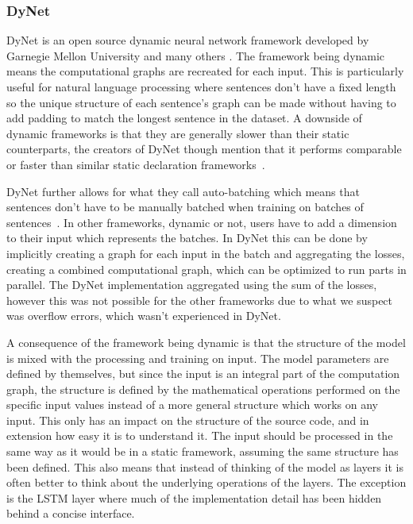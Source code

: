 \subsubsection*{DyNet}\label{sec:setup-implementations-dynet}

DyNet is an open source dynamic neural network framework developed by Garnegie
Mellon University and many others \cite{dynet-git}. The
framework being dynamic means the computational graphs are recreated for each
input. This is particularly useful for natural language processing where
sentences don't have a fixed length so the unique structure of each sentence's
graph can be made without having to add padding to match the longest sentence in
the dataset. A downside of dynamic frameworks is that they are generally slower
than their static counterparts, the creators of DyNet though mention that it
performs comparable or faster than similar static declaration
frameworks~\cite{dynet}.   

DyNet further allows for what they call auto-batching which means that sentences
don't have to be manually batched when training on batches of
sentences~\cite{autobatching}. In other frameworks, dynamic or not, users have
to add a dimension to their input which represents the batches. In DyNet this
can be done by implicitly creating a graph for each input in the batch and
aggregating the losses, creating a combined computational graph, which can be
optimized to run parts in parallel. The DyNet implementation aggregated using
the sum of the losses, however this was not possible for the other frameworks
due to what we suspect was overflow errors, which wasn't experienced in DyNet. 

A consequence of the framework being dynamic is that the structure of the model
is mixed with the processing and training on input. The model parameters are
defined by themselves, but since the input is an integral part of the
computation graph, the structure is defined by the mathematical operations
performed on the specific input values instead of a more general structure which
works on any input. This only has an impact on the structure of the source code,
and in extension how easy it is to understand it. The input should be processed
in the same way as it would be in a static framework, assuming the same
structure has been defined. This also means that instead of thinking of the
model as layers it is often better to think about the underlying operations of
the layers. The exception is the LSTM layer where much of the
implementation detail has been hidden behind a concise interface.

